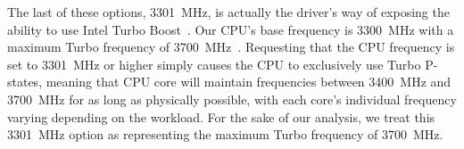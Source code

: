 The last of these options, 3301~MHz, is actually the driver's way of exposing
the ability to use Intel Turbo Boost~\cite{linuxIntelPState}. Our CPU's base
frequency is 3300~MHz with a maximum Turbo frequency of 3700~MHz~\cite{cpuSpecs}.
Requesting that the CPU frequency is set to 3301~MHz or higher simply causes
the CPU to exclusively use Turbo P-states, meaning that CPU core will maintain
frequencies between 3400~MHz and 3700~MHz for as long as physically possible,
with each core's individual frequency varying depending on the workload. For the
sake of our analysis, we treat this 3301~MHz option as representing the maximum
Turbo frequency of 3700~MHz.
